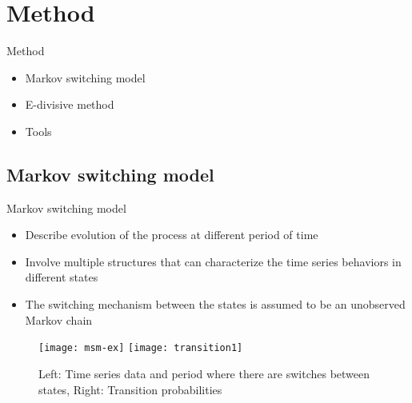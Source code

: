 \documentclass{beamer}
\begin{document}
\section{Method} 
\begin{frame}
Method 
\begin{itemize}
	\item Markov switching model
	\item E-divisive method
	\item Tools
\end{itemize}
\end{frame}
\subsection{Markov switching model}
\begin{frame}[fragile]
Markov switching model \cite{p1}

\begin{itemize}
	\item Describe evolution of the process at different period of time
	\item Involve multiple structures that can characterize the time series behaviors in different states
	\item The switching mechanism between the states is assumed to be an unobserved Markov chain
\end{itemize}

\begin{figure}
	\texttt{[image: msm-ex]}
	\hspace{0.1cm}
	\texttt{[image: transition1]}
	\caption{Left: Time series data and period where there are switches between states, Right: Transition probabilities}
\end{figure}

\end{frame}
\end{document}
